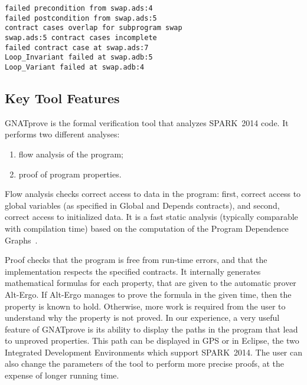 \documentclass[10pt,a4paper,twocolumn]{article}
\newcommand{\gnatprove}{GNATprove\xspace}
\newcommand{\newspark}{SPARK~2014\xspace}
\newcommand{\altergo}{Alt-Ergo\xspace}
\begin{document}
\begin{verbatim}
failed precondition from swap.ads:4
failed postcondition from swap.ads:5
contract cases overlap for subprogram swap
swap.ads:5 contract cases incomplete
failed contract case at swap.ads:7
Loop_Invariant failed at swap.adb:5
Loop_Variant failed at swap.adb:4
\end{verbatim}

\subsection{Key Tool Features}

\gnatprove is the formal verification tool that analyzes \newspark code. It
performs two different analyses:

\begin{enumerate}
\item flow analysis of the program;
\item proof of program properties.
\end{enumerate}

Flow analysis checks correct access to data in the program: first, correct
access to global variables (as specified in Global and Depends contracts), and
second, correct access to initialized data. It is a fast static analysis
(typically comparable with compilation time) based on the computation of the
Program Dependence Graphs~\cite{Horwitz:1988:ISU:53990.53994}.

Proof checks that the program is free from run-time errors, and that the
implementation respects the specified contracts. It internally generates
mathematical formulas for each property, that are given to the automatic prover
\altergo. If \altergo manages to prove the formula in the given time, then the
property is known to hold. Otherwise, more work is required from the user to
understand why the property is not proved. In our experience, a very useful
feature of \gnatprove is its ability to display the paths in the program that
lead to unproved properties. This path can be displayed in GPS or in Eclipse,
the two Integrated Development Environments which support \newspark. The user
can also change the parameters of the tool to perform more precise proofs, at
the expense of longer running time.

\end{document}
